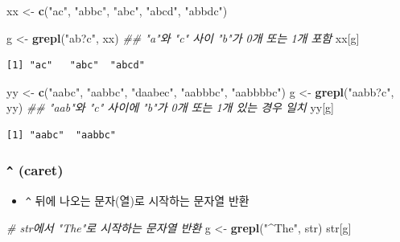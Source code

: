 \documentclass[
  11pt,
]{krantz}
\newenvironment{Shaded}{\begin{snugshade}}{\end{snugshade}}
\newcommand{\CommentTok}[1]{\textcolor[rgb]{0.37,0.37,0.37}{\textit{#1}}}
\newcommand{\KeywordTok}[1]{\textcolor[rgb]{0.27,0.27,0.27}{\textbf{#1}}}
\newcommand{\NormalTok}[1]{#1}
\newcommand{\StringTok}[1]{\textcolor[rgb]{0.5,0.5,0.5}{#1}}
\providecommand{\tightlist}{%
  \setlength{\itemsep}{0pt}\setlength{\parskip}{0pt}}
\begin{document}
\footnotesize

\begin{Shaded}
\begin{Highlighting}[]
\NormalTok{xx <-}\StringTok{ }\KeywordTok{c}\NormalTok{(}\StringTok{"ac"}\NormalTok{, }\StringTok{"abbc"}\NormalTok{, }\StringTok{"abc"}\NormalTok{, }\StringTok{"abcd"}\NormalTok{, }\StringTok{"abbdc"}\NormalTok{)}

\NormalTok{g <-}\StringTok{ }\KeywordTok{grepl}\NormalTok{(}\StringTok{"ab?c"}\NormalTok{, xx) }\CommentTok{## "a"와 "c" 사이 "b"가 0개 또는 1개 포함}
\NormalTok{xx[g]}
\end{Highlighting}
\end{Shaded}

\begin{verbatim}
[1] "ac"   "abc"  "abcd"
\end{verbatim}

\begin{Shaded}
\begin{Highlighting}[]
\NormalTok{yy <-}\StringTok{ }\KeywordTok{c}\NormalTok{(}\StringTok{"aabc"}\NormalTok{, }\StringTok{"aabbc"}\NormalTok{, }\StringTok{"daabec"}\NormalTok{, }\StringTok{"aabbbc"}\NormalTok{, }\StringTok{"aabbbbc"}\NormalTok{)}
\NormalTok{g <-}\StringTok{ }\KeywordTok{grepl}\NormalTok{(}\StringTok{"aabb?c"}\NormalTok{, yy) }\CommentTok{## "aab"와 "c" 사이에 "b"가 0개 또는 1개 있는 경우 일치}
\NormalTok{yy[g]}
\end{Highlighting}
\end{Shaded}

\begin{verbatim}
[1] "aabc"  "aabbc"
\end{verbatim}

\normalsize

\hypertarget{caret}{%
\subsubsection*{\texorpdfstring{\textbf{\texttt{\^{}} (caret)}}{\^{} (caret)}}\label{caret}}


\begin{itemize}
\tightlist
\item
  \texttt{\^{}} 뒤에 나오는 문자(열)로 시작하는 문자열 반환
\end{itemize}

\footnotesize

\begin{Shaded}
\begin{Highlighting}[]
\CommentTok{# str에서 "The"로 시작하는 문자열 반환}
\NormalTok{g <-}\StringTok{ }\KeywordTok{grepl}\NormalTok{(}\StringTok{"^The"}\NormalTok{, str)}
\NormalTok{str[g]}
\end{Highlighting}
\end{Shaded}
\end{document}
